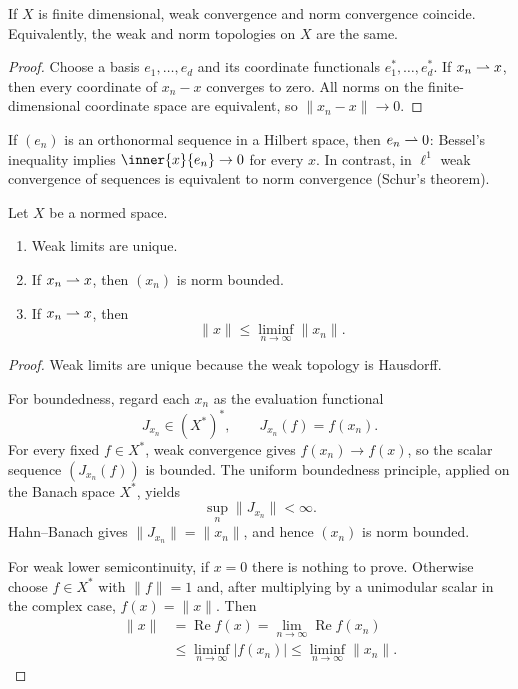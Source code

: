 \begin{notetheorem}
If $X$ is finite dimensional, weak convergence and norm convergence coincide.
Equivalently, the weak and norm topologies on $X$ are the same.
\end{notetheorem}

\begin{proof}
Choose a basis $e_1,\ldots,e_d$ and its coordinate functionals
$e_1^*,\ldots,e_d^*$.  If $x_n\rightharpoonup x$, then every coordinate of $x_n-x$
converges to zero.  All norms on the finite-dimensional coordinate space are
equivalent, so $\|x_n-x\|\to0$.
\end{proof}

\begin{noteexample}
If $(e_n)$ is an orthonormal sequence in a Hilbert space, then
$e_n\rightharpoonup0$: Bessel's inequality implies $\inner{x}{e_n}\to0$ for every
$x$.  In contrast, in $\ell^1$ weak convergence of sequences is equivalent to
norm convergence (Schur's theorem).
\end{noteexample}

\begin{noteproposition}
Let $X$ be a normed space.
\begin{enumerate}
  \item Weak limits are unique.
  \item If $x_n\rightharpoonup x$, then $(x_n)$ is norm bounded.
  \item If $x_n\rightharpoonup x$, then
        \[
          \|x\|\le\liminf_{n\to\infty}\|x_n\|.
        \]
\end{enumerate}
\end{noteproposition}

\begin{proof}
Weak limits are unique because the weak topology is Hausdorff.

For boundedness, regard each $x_n$ as the evaluation functional
\[
  J_{x_n}\in(X^*)^*,\qquad J_{x_n}(f)=f(x_n).
\]
For every fixed $f\in X^*$, weak convergence gives
$f(x_n)\to f(x)$, so the scalar sequence $(J_{x_n}(f))$ is bounded.  The
uniform boundedness principle, applied on the Banach space $X^*$, yields
\[
  \sup_n\|J_{x_n}\|<\infty.
\]
Hahn--Banach gives $\|J_{x_n}\|=\|x_n\|$, and hence $(x_n)$ is norm bounded.

For weak lower semicontinuity, if $x=0$ there is nothing to prove.  Otherwise
choose $f\in X^*$ with $\|f\|=1$ and, after multiplying by a unimodular
scalar in the complex case, $f(x)=\|x\|$.  Then
\[
\begin{aligned}
  \|x\|
   &=\operatorname{Re}f(x)
    =\lim_{n\to\infty}\operatorname{Re}f(x_n)\\
   &\le\liminf_{n\to\infty}|f(x_n)|
    \le\liminf_{n\to\infty}\|x_n\|.
\end{aligned}
\]
\end{proof}

